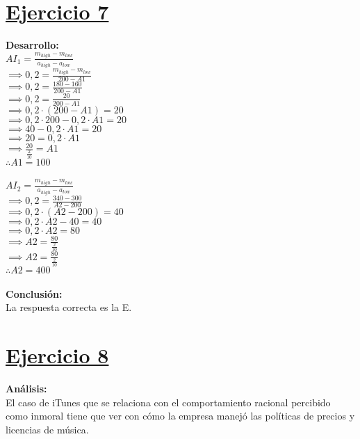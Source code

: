 \documentclass{article}
\newcommand{\ulcolor}[2][Red]{\setulcolor{#1}\ul{#2}}
\begin{document}
    \section*{\ulcolor[Green]{Ejercicio 7}}
        \textbf{Desarrollo:} \\
        \(AI_{1} = \frac{m_{high} - m_{low}}{a_{high} - a_{low}}\) \\
        \(\implies 0,2 = \frac{m_{high} - m_{low}}{200 - A1}\) \\
        \(\implies 0,2 = \frac{180 - 160}{200 - A1}\) \\
        \(\implies 0,2 = \frac{20}{200 - A1}\) \\
        \(\implies 0,2 \cdot (200 - A1) = 20\) \\
        \(\implies 0,2 \cdot 200 - 0,2 \cdot A1 = 20\) \\
        \(\implies 40 - 0,2 \cdot A1 = 20\) \\
        \(\implies 20 = 0,2 \cdot A1\) \\
        \(\implies \frac{20}{\frac{2}{10}} = A1\) \\
        \(\therefore A1 = 100\) \\
        \\
        \(AI_{2} = \frac{m_{high} - m_{low}}{a_{high} - a_{low}}\) \\
        \(\implies 0,2 = \frac{340 - 300}{A2 - 200}\) \\
        \(\implies 0,2 \cdot (A2 - 200) = 40\) \\
        \(\implies 0,2 \cdot A2 - 40 = 40\) \\
        \(\implies 0,2 \cdot A2 = 80\) \\
        \(\implies A2 = \frac{80}{\frac{2}{10}}\) \\
        \(\implies A2 = \frac{80}{\frac{2}{10}}\) \\
        \(\therefore A2 = 400\) \\
        \\
        \textbf{Conclusión:} \\
        La respuesta correcta es la E.
    \section*{\ulcolor[Green]{Ejercicio 8}}
        \textbf{Análisis:} \\
        El caso de iTunes que se relaciona con el comportamiento racional percibido como inmoral tiene que ver con cómo la empresa manejó las políticas de precios y licencias de música.
\end{document}
